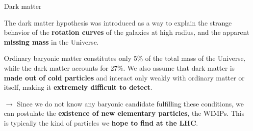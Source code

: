 \documentclass[8 pt]{beamer}
\begin{document}
\begin{frame}{Dark matter}
	
   \begin{minipage}[c]{.49\linewidth}
	\justifying
	The dark matter hypothesis was introduced as a way to explain the strange behavior of the \textbf{rotation curves} of the galaxies at high radius, and the apparent \textbf{missing mass} in the Universe. \vfill
   \end{minipage} \hfill
   \begin{minipage}[c]{.49\linewidth}
   \end{minipage} \hfill \vfill	
   
   \begin{minipage}[c]{.34\linewidth}
   \end{minipage} \hfill
   \begin{minipage}[c]{.64\linewidth}
   	\justifying
	Ordinary baryonic matter constitutes only  5\% of the total mass of the Universe, while the dark matter accounts for 27\%. \vfill \vspace{8pt}We also assume that dark matter is \textbf{made out of cold particles} and interact only weakly with ordinary matter or itself, making it \textbf{extremely difficult to detect}.
    \end{minipage} \hfill \vfill	
    
    \begin{block}{}
	\justifying
	\vspace{5pt}
   $\rightarrow$ Since we do not know any baryonic candidate fulfilling these conditions, we can postulate the \textbf{existence of new elementary particles}, the WIMPs. This is typically the kind of particles we \textbf{hope to find at the LHC}. \vspace{5pt}
    \end{block} \vfill
	
\end{frame}
\end{document}
